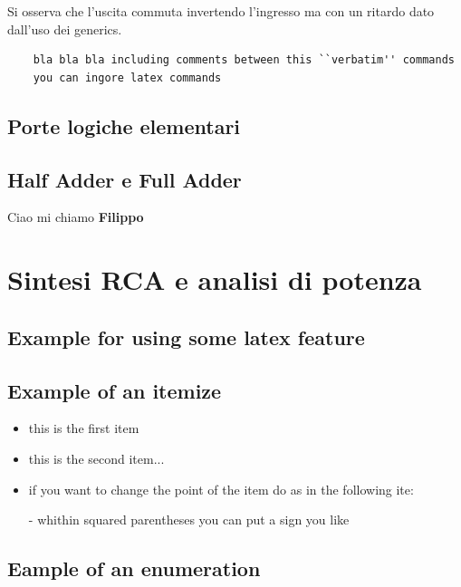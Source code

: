 Si osserva che l'uscita commuta invertendo l'ingresso ma con un ritardo
dato dall'uso dei generics.

	\begin{verbatim}
	bla bla bla including comments between this ``verbatim'' commands
	you can ingore latex commands  	
	\end{verbatim}

\subsection{Porte logiche elementari}

\subsection{Half Adder e Full Adder}

Ciao mi chiamo \textbf{Filippo}




\section{Sintesi RCA e analisi di potenza}



\subsection{Example for using some latex feature}

\subsection{Example of an itemize}

\begin{itemize}
\item this is the first item
\item this is the second item...
\item if you want to change the point of the item do as in the following ite:
\item[-] whithin squared parentheses you can put a sign you like
\end{itemize} 


\subsection{Eample of an enumeration}


